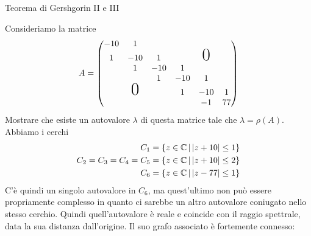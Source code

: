 \documentclass[a4paper]{article}
\begin{document}
\begin{radioactive}
\begin{snippetexample}{Teorema di Gershgorin II e III}
\begin{figure}
\begin{center}
            \end{center}
            \vspace{-3cm}
        \end{figure}
        Consideriamo la matrice \[
            A =
            \begin{pmatrix}
                -10 & 1   &     &     &                &    \\
                1   & -10 & 1   &     & \text{\huge 0} &    \\
                & 1   & -10 & 1   &                &    \\
                &     & 1   & -10 & 1              &    \\
                & \text{\huge 0} && 1        & -10 & 1  \\
                &     &     &     & -1             & 77
            \end{pmatrix}
        \]
        Mostrare che esiste un autovalore \(\lambda\) di questa matrice tale che
        \(\lambda = \rho(A)\). \\
        Abbiamo i cerchi
        \begin{align*}
            C_1 &= \{ z \in \mathbb{C} \,|\, |z+10| \leq 1\} \\
            C_2 = C_3 = C_4 = C_5 &= \{ z \in \mathbb{C} \,|\, |z+10| \leq 2\} \\
            C_6 &= \{ z \in \mathbb{C} \,|\, |z-77| \leq 1\}
        \end{align*}
        C'è quindi un singolo autovalore in \(C_6\),
        ma quest'ultimo non può essere propriamente complesso in quanto ci sarebbe un altro
        autovalore coniugato nello stesso cerchio.
        Quindi quell'autovalore è reale e coincide con il raggio spettrale, data la sua distanza dall'origine.
        Il suo grafo associato è fortemente connesso:
        \begin{center}
\end{center}
\end{snippetexample}
\end{radioactive}
\end{document}
